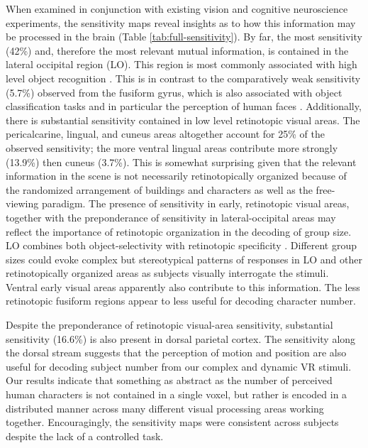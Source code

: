 \documentclass[preprint,5p,authoryear]{elsarticle}
\begin{document}
When examined in conjunction with existing vision and cognitive neuroscience experiments, the sensitivity maps reveal insights as to how this information may be processed in the brain (Table \ref{tab:full-sensitivity}).
By far, the most sensitivity (42\%) and, therefore the most relevant mutual information, is contained in the lateral occipital region (LO).
This region is most commonly associated with high level object recognition \citep{Grill-Spector2001}.
This is in contrast to the comparatively weak sensitivity (5.7\%) observed from the fusiform gyrus, which is also associated with object classification tasks and in particular the perception of human faces \citep{Kanwisher1997}.
Additionally, there is substantial sensitivity contained in low level retinotopic visual areas. 
The pericalcarine, lingual, and cuneus areas altogether account for 25\% of the observed sensitivity; the more ventral lingual areas contribute more strongly (13.9\%) then cuneus (3.7\%).
This is somewhat surprising given that the relevant information in the scene is not necessarily retinotopically organized because of the randomized arrangement of buildings and characters as well as the free-viewing paradigm.
The presence of sensitivity in early, retinotopic visual areas, together with the preponderance of sensitivity in lateral-occipital areas may reflect the importance of retinotopic organization in the decoding of group size. 
LO combines both object-selectivity with retinotopic specificity \citep{Sayres2008}. 
Different group sizes could evoke complex but stereotypical patterns of responses in LO and other retinotopically organized areas as subjects visually interrogate the stimuli. 
Ventral early visual areas apparently also contribute to this information. 
The less retinotopic fusiform regions \citep{Schwarzlose2008,Sayres2010} appear to less useful for decoding character number.

Despite the preponderance of retinotopic visual-area sensitivity, substantial sensitivity (16.6\%) is also present in dorsal parietal cortex. 
The sensitivity along the dorsal stream suggests that the perception of motion and position are also useful for decoding subject number from our complex and dynamic VR stimuli.
Our results indicate that something as abstract as the number of perceived human characters is not contained in a single voxel, but rather is encoded in a distributed manner across many different visual processing areas working together.
Encouragingly, the sensitivity maps were consistent across subjects despite the lack of a controlled task.
\end{document}
